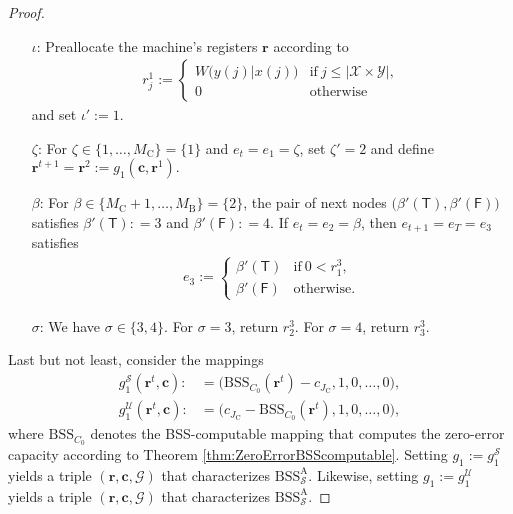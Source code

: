 \documentclass[conference]{IEEEtran}
\def\X{{\mathcal X}}
\def\Y{{\mathcal Y}}
\def\G{{\mathcal G}}
\def\S{{\mathcal S}}
\def\U{{\mathcal U}}
\def\mA{\bm{\mathrm{A}}}
\newcommand{\BSS}{\mathrm{BSS}}
\begin{document}
\begin{proof}
					\begin{enumerate}	\item[\(\iota\)\hspace{1pt}:] Preallocate the machine's registers \(\bm{r}\) according to
											\begin{align}	r^1_j :=	\begin{cases}	W\big(y(j)|x(j)\big)	&\text{if}~ j\leq |\X\times\Y|,\\
																						0						&\text{otherwise}
																		\end{cases}
											\end{align}
											and set \(\iota' := 1\).
										\item[\(\zeta\)\hspace{1pt}:] For \(\zeta \in \{1,\ldots, M_\mathrm{C}\} = \{1\}\) and \(e_t = e_1 = \zeta\), set \(\zeta' = 2\) and define 
											\(\bm{r}^{t+1} = \bm{r}^{2} := g_1(\bm{c},\bm{r}^1).
											\)
										\item[\(\beta\)\hspace{1pt}:] 
											For \(\beta \in \{M_\mathrm{C} + 1,\ldots, M_\mathrm{B}\} = \{2\}\), the pair of next nodes \(\big(\beta'(\mathsf{T}),
											\beta'(\mathsf{F})\big)\) satisfies
											\(\beta'(\mathsf{T}) :    =  3\) and \(\beta'(\mathsf{F}) :    =  4\).
											If \(e_t = e_2 = \beta\), then \(e_{t+1} = e_T = e_3\) satisfies
											\begin{align*}   e_{3} := 	\begin{cases}   \beta'(\mathsf{T}) &\text{if}~ 0 < r_1^3,\\
																						\beta'(\mathsf{F}) &\text{otherwise}.
																		\end{cases}
											\end{align*}
										\item[\(\sigma\)\hspace{1pt}:] We have \(\sigma \in \{3,4\}\). For \(\sigma = 3\), return \(r_2^3\). For \(\sigma = 4\), return \(r_3^3\).
					\end{enumerate}
					Last but not least, consider the mappings
					\begin{align*}	g_1^\S(\bm{r}^t,\bm{c}) :&= \big(\BSS_{C_0}(\bm{r}^t) - c_{J_\mathrm{C}}, 1, 0, \ldots, 0\big), \\
									g_1^\U(\bm{r}^t,\bm{c}) :&= \big(c_{J_\mathrm{C}} - \BSS_{C_0}(\bm{r}^t), 1, 0, \ldots, 0\big), 
					\end{align*}
					where \(\BSS_{C_0}\) denotes the BSS-computable mapping that computes the zero-error capacity according to Theorem \ref{thm:ZeroErrorBSScomputable}. 
					Setting \(g_1 := g_1^\S\) yields a triple \((\bm{r}, \bm{c}, \G)\)
					that characterizes \(\BSS_{\S}^{\mA}\). Likewise, setting \(g_1 := g_1^\U\) yields a triple \((\bm{r}, \bm{c}, \G)\)
					that characterizes \(\BSS_{\S}^{\mA}\).
	\end{proof}
	
\end{document}

